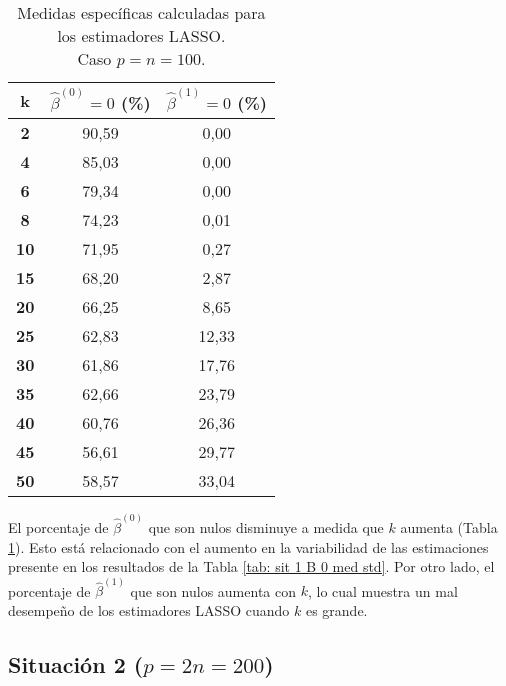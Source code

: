 \documentclass[a4paper,12pt]{report}
\begin{document}
\begin{table}[H]
\centering
\caption{Medidas específicas calculadas para los estimadores LASSO. \\ Caso $p=n=100$.}
\label{tab: sit 1 lasso measures}
\footnotesize
\begin{tabular}{c|c|c}
\textbf{k} & $\hat{\beta}^{(0)} = 0$ (\%) & $\hat{\beta}^{(1)} = 0$ (\%) \\
\hline
\textbf{2} & 90,59 & \hspace{0.07cm} 0,00 \\
\textbf{4} & 85,03 & \hspace{0.07cm} 0,00 \\
\textbf{6} & 79,34 & \hspace{0.07cm} 0,00 \\
\textbf{8} & 74,23 & \hspace{0.07cm} 0,01 \\
\textbf{10} & 71,95 & \hspace{0.07cm} 0,27 \\
\textbf{15} & 68,20 & \hspace{0.07cm} 2,87 \\
\textbf{20} & 66,25 & \hspace{0.07cm} 8,65 \\
\textbf{25} & 62,83 & 12,33 \\
\textbf{30} & 61,86 & 17,76 \\
\textbf{35} & 62,66 & 23,79 \\
\textbf{40} & 60,76 & 26,36 \\
\textbf{45} & 56,61 & 29,77 \\
\textbf{50} & 58,57 & 33,04
\end{tabular}
\end{table}

El porcentaje de $\hat{\beta}^{(0)}$ que son nulos disminuye a medida que $k$ aumenta (Tabla \ref{tab: sit 1 lasso measures}). Esto está relacionado con el aumento en la variabilidad de las estimaciones presente en los resultados de la Tabla \ref{tab: sit 1 B 0 med std}. Por otro lado, el porcentaje de $\hat{\beta}^{(1)}$ que son nulos aumenta con $k$, lo cual muestra un mal desempeño de los estimadores LASSO cuando $k$ es grande.

\subsection*{Situación 2 ($p=2n=200$)}
\end{document}
